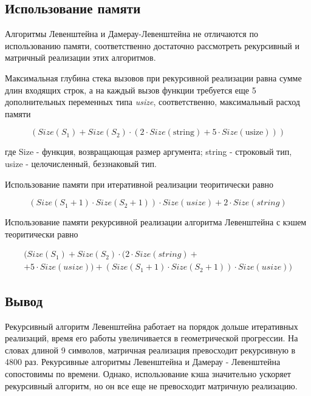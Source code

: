 \documentclass[14pt,russian]{scrartcl}
\begin{document}
\subsection{Использование памяти}

	\par
	Алгоритмы Левенштейна и Дамерау-Левенштейна не отличаются по использованию памяти, соответственно достаточно рассмотреть рекурсивный и матричный реализации этих алгоритмов.

	\par
	Максимальная глубина стека вызовов при рекурсивной реализации равна сумме длин входящих строк, а на каждый вызов функции требуется еще 5 дополнительных переменных типа \textit{usize}, соответственно, максимальный расход памяти

	\begin{equation}
		(Size(S_{1}) + Size(S_{2}) \cdot (2 \cdot Size(\text{string}) + 5 \cdot Size(\text{usize})))
	\end{equation}
	
	\noindent
	где Size - функция, возвращающая размер аргумента; string - строковый тип, usize - целочисленный, беззнаковый тип.

	\par
	Использование памяти при итеративной реализации теоритически равно

	\begin{equation}
		\label{eq:mem_req}
		(Size(S_{1} + 1) \cdot Size(S_{2} + 1)) \cdot Size(usize) + 2 \cdot Size(string)
	\end{equation}

	\par
	Использование памяти рекурсивной реализации алгоритма Левенштейна с кэшем теоритически равно

	\begin{multline}
		\label{eq:mem_iter}
		(Size(S_{1}) + Size(S_{2}) \cdot (2 \cdot Size(string) +\\+ 5 \cdot Size(usize)) + (Size(S_{1} + 1) \cdot Size(S_{2} + 1)) \cdot Size(usize))
	\end{multline}
	\subsection{Вывод}

	\par
	Рекурсивный алгоритм Левенштейна работает на порядок дольше итеративных реализаций, время его работы увеличивается в геометрической прогрессии. На словах длиной 9 символов, матричная реализация превосходит рекурсивную в 4800 раз. Рекурсивные алгоритмы Левенштейна и Дамерау - Левенштейна сопостовимы по времени. Однако, использование кэша значительно ускоряет рекурсивный алгоритм, но он все еще не превосходит матричную реализацию.
\end{document}
